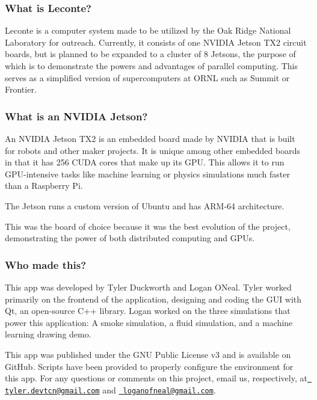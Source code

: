 \subsubsection*{What is Leconte?}



Leconte is a computer system made to be utilized by the Oak Ridge National Laboratory for outreach. Currently, it consists of one N\+V\+I\+D\+IA Jetson T\+X2 circuit boards, but is planned to be expanded to a cluster of 8 Jetsons, the purpose of which is to demonstrate the powers and advantages of parallel computing. This serves as a simplified version of supercomputers at O\+R\+NL such as Summit or Frontier.

\subsubsection*{What is an N\+V\+I\+D\+IA Jetson?}

An N\+V\+I\+D\+IA Jetson T\+X2 is an embedded board made by N\+V\+I\+D\+IA that is built for robots and other maker projects. It is unique among other embedded boards in that it has 256 C\+U\+DA cores that make up its G\+PU. This allows it to run G\+P\+U-\/intensive tasks like machine learning or physics simulations much faster than a Raspberry Pi.

The Jetson runs a custom version of Ubuntu and has A\+R\+M-\/64 architecture.

This was the board of choice because it was the best evolution of the project, demonstrating the power of both distributed computing and G\+P\+Us.

\subsubsection*{Who made this?}

This app was developed by Tyler Duckworth and Logan O\textquotesingle{}Neal. Tyler worked primarily on the frontend of the application, designing and coding the G\+UI with Qt, an open-\/source C++ library. Logan worked on the three simulations that power this application\+: A smoke simulation, a fluid simulation, and a machine learning drawing demo.

This app was published under the G\+NU Public License v3 and is available on Git\+Hub. Scripts have been provided to properly configure the environment for this app. For any questions or comments on this project, email us, respectively, at \href{mailto:tyler.devtcn@gmail.com}{\texttt{ tyler.\+devtcn@gmail.\+com}} and \href{mailto:loganofneal@gmail.com}{\texttt{ loganofneal@gmail.\+com}}. 